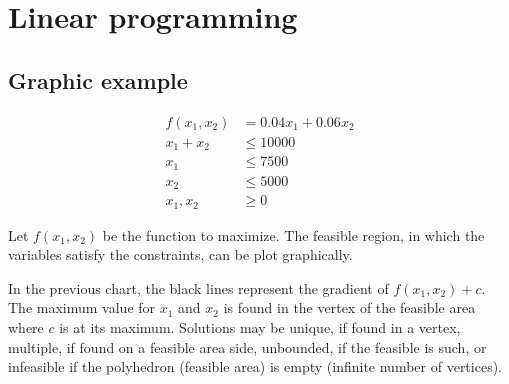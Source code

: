 \section{Linear programming}

\subsection{Graphic example}

\begin{align*}
    f(x_1, x_2) & = 0.04 x_1 + 0.06 x_2 \\
    x_1 + x_2 & \le 10000 \\
    x_1 & \le 7500 \\
    x_2 & \le 5000 \\
    x_1, x_2 & \ge 0
\end{align*}

Let $f(x_1, x_2)$ be the function to maximize.
The feasible region, in which the variables satisfy the constraints, can be plot graphically.

\begin{figure}[H]
    \centering
\end{figure}

In the previous chart, the black lines represent the gradient of $f(x_1, x_2) + c$.
The maximum value for $x_1$ and $x_2$ is found in the vertex of the feasible area where $c$ is at its maximum.
Solutions may be unique, if found in a vertex, multiple, if found on a feasible area side, unbounded, if the feasible is such, or infeasible if the polyhedron (feasible area) is empty (infinite number of vertices).

